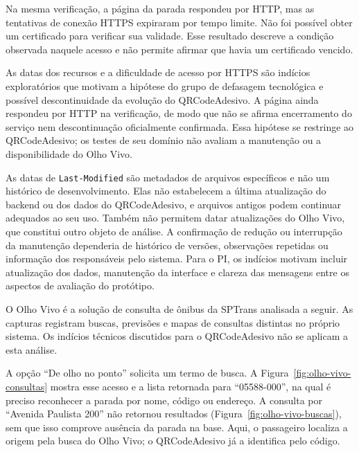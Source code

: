 \documentclass[12pt,oneside,a4paper,brazil,chapter=TITLE]{abntex2}
\begin{document}
Na mesma verificação, a página da parada respondeu por HTTP, mas as tentativas de conexão HTTPS expiraram por tempo limite. Não foi possível obter um certificado para verificar sua validade. Esse resultado descreve a condição observada naquele acesso e não permite afirmar que havia um certificado vencido.

As datas dos recursos e a dificuldade de acesso por HTTPS são indícios exploratórios que motivam a hipótese do grupo de defasagem tecnológica e possível descontinuidade da evolução do QRCodeAdesivo. A página ainda respondeu por HTTP na verificação, de modo que não se afirma encerramento do serviço nem descontinuação oficialmente confirmada. Essa hipótese se restringe ao QRCodeAdesivo; os testes de seu domínio não avaliam a manutenção ou a disponibilidade do Olho Vivo.

As datas de \texttt{Last-Modified} são metadados de arquivos específicos e não um histórico de desenvolvimento. Elas não estabelecem a última atualização do backend ou dos dados do QRCodeAdesivo, e arquivos antigos podem continuar adequados ao seu uso. Também não permitem datar atualizações do Olho Vivo, que constitui outro objeto de análise. A confirmação de redução ou interrupção da manutenção dependeria de histórico de versões, observações repetidas ou informação dos responsáveis pelo sistema. Para o PI, os indícios motivam incluir atualização dos dados, manutenção da interface e clareza das mensagens entre os aspectos de avaliação do protótipo.


\clearpage
\label{sec:analise-olhovivo}
O Olho Vivo é a solução de consulta de ônibus da SPTrans analisada a seguir. As capturas registram buscas, previsões e mapas de consultas distintas no próprio sistema. Os indícios técnicos discutidos para o QRCodeAdesivo não se aplicam a esta análise.

A opção ``De olho no ponto'' solicita um termo de busca. A Figura~\ref{fig:olho-vivo-consultas} mostra esse acesso e a lista retornada para ``05588-000'', na qual é preciso reconhecer a parada por nome, código ou endereço. A consulta por ``Avenida Paulista 200'' não retornou resultados (Figura~\ref{fig:olho-vivo-buscas}), sem que isso comprove ausência da parada na base. Aqui, o passageiro localiza a origem pela busca do Olho Vivo; o QRCodeAdesivo já a identifica pelo código.
\end{document}
